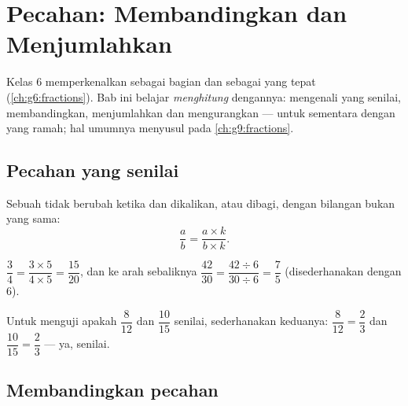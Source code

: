 \chapter{Pecahan: Membandingkan dan Menjumlahkan}\label{ch:g7:fractions}

Kelas 6 memperkenalkan  sebagai bagian dan sebagai 
yang tepat (\cref{ch:g6:fractions}). Bab ini belajar \emph{menghitung}
dengannya: mengenali  yang senilai, membandingkan, menjumlahkan
dan mengurangkan --- untuk sementara dengan  yang ramah; hal
umumnya menyusul pada \cref{ch:g9:fractions}.

\section{Pecahan yang senilai}

\begin{theorem}\label{thm:g7:fractions:equal}
Sebuah  tidak berubah ketika  dan 
dikalikan, atau dibagi, dengan bilangan bukan  yang sama:
\[
\frac{a}{b} = \frac{a \times k}{b \times k} .
\]
\end{theorem}
\admitted

\begin{example}\label{ex:g7:fractions:equal}
$\dfrac{3}{4} = \dfrac{3 \times 5}{4 \times 5} = \dfrac{15}{20}$, dan
ke arah sebaliknya $\dfrac{42}{30} = \dfrac{42 \div 6}{30 \div 6}
= \dfrac{7}{5}$ (disederhanakan dengan $6$).

Untuk menguji apakah $\dfrac{8}{12}$ dan $\dfrac{10}{15}$ senilai,
sederhanakan keduanya: $\dfrac{8}{12} = \dfrac{2}{3}$ dan
$\dfrac{10}{15} = \dfrac{2}{3}$ --- ya, senilai.
\end{example}

\section{Membandingkan pecahan}

